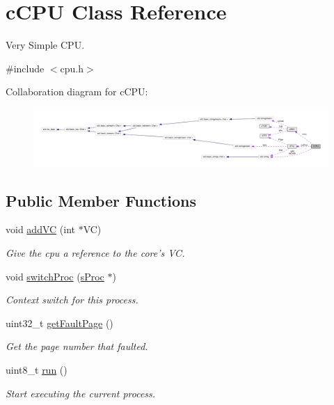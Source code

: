 \hypertarget{classcCPU}{\section{c\-C\-P\-U \-Class \-Reference}
\label{d2/dc6/classcCPU}
}


\-Very \-Simple \-C\-P\-U.  




{\ttfamily \#include $<$cpu.\-h$>$}



\-Collaboration diagram for c\-C\-P\-U\-:\nopagebreak
\begin{figure}[H]
\begin{center}
\leavevmode
\includegraphics[width=350pt]{d9/d80/classcCPU__coll__graph}
\end{center}
\end{figure}
\subsection*{\-Public \-Member \-Functions}
\begin{DoxyCompactItemize}
\item 
void \hyperlink{classcCPU_a2a76a12433bce75b45c7b0f5b1eb9e0c}{add\-V\-C} (int $\ast$\-V\-C)
\begin{DoxyCompactList}\small\item\em \-Give the cpu a reference to the core's \-V\-C. \end{DoxyCompactList}\item 
void \hyperlink{classcCPU_abbc235250416bd5bcba0630617988bb4}{switch\-Proc} (\hyperlink{structsProc}{s\-Proc} $\ast$)
\begin{DoxyCompactList}\small\item\em \-Context switch for this process. \end{DoxyCompactList}\item 
uint32\-\_\-t \hyperlink{classcCPU_a37f4ab4a93668da37be34f8d4d77a339}{get\-Fault\-Page} ()
\begin{DoxyCompactList}\small\item\em \-Get the page number that faulted. \end{DoxyCompactList}\item 
uint8\-\_\-t \hyperlink{classcCPU_a68467fbd50317a9495765606d2f7d4b1}{run} ()
\begin{DoxyCompactList}\small\item\em \-Start executing the current process. \end{DoxyCompactList}\end{DoxyCompactItemize}
